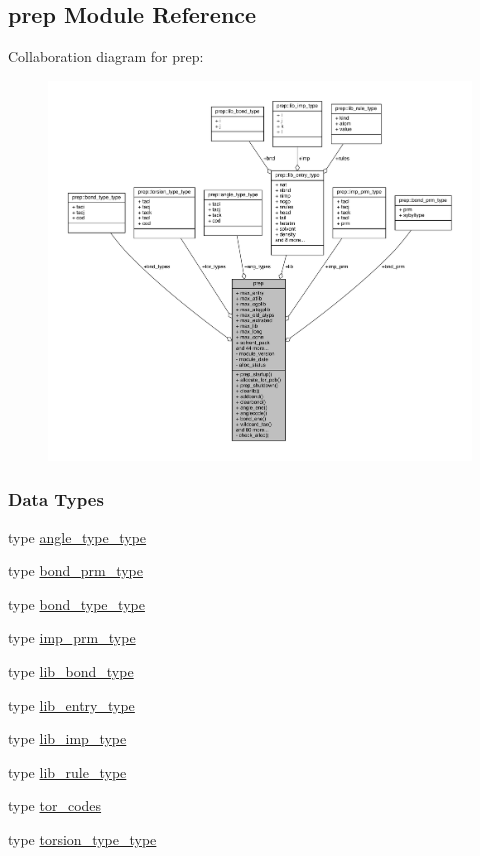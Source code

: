 \hypertarget{classprep}{\subsection{prep Module Reference}
\label{classprep}
}


Collaboration diagram for prep\-:
\nopagebreak
\begin{figure}[H]
\begin{center}
\leavevmode
\includegraphics[width=350pt]{classprep__coll__graph}
\end{center}
\end{figure}
\subsubsection*{Data Types}
\begin{DoxyCompactItemize}
\item 
type \hyperlink{structprep_1_1angle__type__type}{angle\-\_\-type\-\_\-type}
\item 
type \hyperlink{structprep_1_1bond__prm__type}{bond\-\_\-prm\-\_\-type}
\item 
type \hyperlink{structprep_1_1bond__type__type}{bond\-\_\-type\-\_\-type}
\item 
type \hyperlink{structprep_1_1imp__prm__type}{imp\-\_\-prm\-\_\-type}
\item 
type \hyperlink{structprep_1_1lib__bond__type}{lib\-\_\-bond\-\_\-type}
\item 
type \hyperlink{structprep_1_1lib__entry__type}{lib\-\_\-entry\-\_\-type}
\item 
type \hyperlink{structprep_1_1lib__imp__type}{lib\-\_\-imp\-\_\-type}
\item 
type \hyperlink{structprep_1_1lib__rule__type}{lib\-\_\-rule\-\_\-type}
\item 
type \hyperlink{structprep_1_1tor__codes}{tor\-\_\-codes}
\item 
type \hyperlink{structprep_1_1torsion__type__type}{torsion\-\_\-type\-\_\-type}
\end{DoxyCompactItemize}
